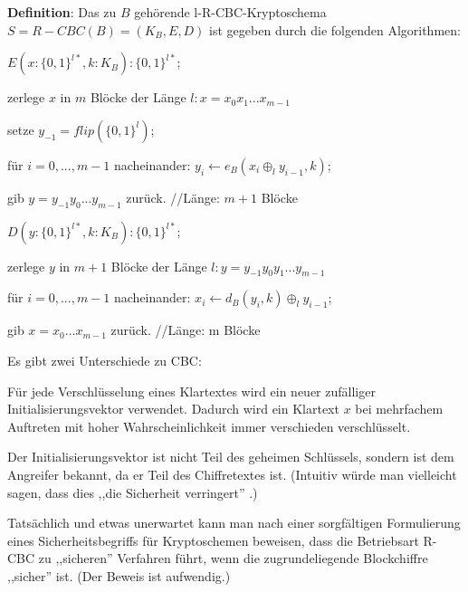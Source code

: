 \documentclass[a4paper]{article}
\begin{document}
\begin{multicols}{3}
    \textbf{Definition}: Das zu $B$ gehörende l-R-CBC-Kryptoschema $S=R-CBC(B) = (K_B,E,D)$ ist gegeben durch die folgenden Algorithmen:
    \begin{itemize*}
        \item $E(x:\{0,1\}^{l*},k:K_B) :\{0,1\}^{l*}$;
        \item zerlege $x$ in $m$ Blöcke der Länge $l:x=x_0 x_1 ...x_{m-1}$
        \item setze $y_{-1}= flip(\{0,1\}^l)$;
        \item für $i=0,...,m-1$ nacheinander: $y_i\leftarrow e_B(x_i\oplus_l y_{i-1} ,k)$;
        \item gib $y=y_{-1} y_0 ...y_{m-1}$ zurück. //Länge: $m+1$ Blöcke
        \item $D(y:\{0,1\}^{l*},k:K_B) :\{0,1\}^{l*}$;
        \item zerlege $y$ in $m+1$ Blöcke der Länge $l:y=y_{-1} y_0 y_1 ...y_{m-1}$
        \item für $i=0,...,m-1$ nacheinander: $x_i\leftarrow d_B(y_i,k)\oplus_l y_{i-1}$;
        \item gib $x=x_0 ...x_{m-1}$ zurück. //Länge: m Blöcke
    \end{itemize*}

    Es gibt zwei Unterschiede zu CBC:
    \begin{enumerate*}
        \item Für jede Verschlüsselung eines Klartextes wird ein neuer zufälliger Initialisierungsvektor verwendet. Dadurch wird ein Klartext $x$ bei mehrfachem Auftreten mit hoher Wahrscheinlichkeit immer verschieden verschlüsselt.
        \item Der Initialisierungsvektor ist nicht Teil des geheimen Schlüssels, sondern ist dem Angreifer bekannt, da er Teil des Chiffretextes ist. (Intuitiv würde man vielleicht sagen, dass dies ,,die Sicherheit verringert'' .)
    \end{enumerate*}

    Tatsächlich und etwas unerwartet kann man nach einer sorgfältigen Formulierung eines Sicherheitsbegriffs für Kryptoschemen beweisen, dass die Betriebsart R-CBC zu ,,sicheren'' Verfahren führt, wenn die zugrundeliegende Blockchiffre ,,sicher'' ist. (Der Beweis ist
    aufwendig.)


\end{multicols}
\end{document}
